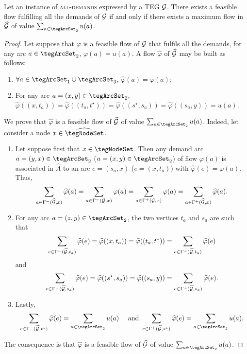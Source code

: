 \begin{bibunit}[ieeetr]
\begin{theorem}\label{theo:pol}
Let an instance of \textsc{all-demands} expressed by a TEG ${\cal G}$.
There exists a feasible flow fulfilling all the demands of ${\cal G}$ if and only if there exists a maximum flow in $\widehat{\cal G}$ of value $\sum_{a\in \tegArcSet_2} u(a)$. 
\end{theorem}
\begin{proof}
Let suppose that $\varphi$ is a feasible flow of ${\cal G}$ that fulfils all the demands, \ie for any arc $a\in \tegArcSet_2$, $\varphi(a)=u(a)$.
A flow $\widehat{\varphi}$ of $\widehat{\cal G}$ may be built as follows:
\begin{enumerate}
\item
$\forall a\in \tegArcSet_1 \cup \tegArcSet_3$, 
$\widehat{\varphi}(a)=\varphi(a)$;
\item
For any arc $a=(x,y)\in \tegArcSet_2$, 
$\widehat{\varphi}((x,t_a))=\widehat{\varphi}((t_a,t^\star))=\widehat{\varphi}((s^\star, s_a))=\widehat{\varphi}( (s_a,y))=u(a)$.
\end{enumerate}
We prove that $\widehat \varphi$ is a feasible flow of $\widehat{\cal G}$ of value $\sum_{a \in \tegArcSet_2} u(a)$. 
Indeed, let consider a node $x \in \widehat{\tegNodeSet}$.
\begin{enumerate}
\item Let suppose first that $x \in \tegNodeSet$. Then any demand arc ${a = (y,x) \in \tegArcSet_2}$ (\resp ${a = (x,y) \in \tegArcSet_2}$) of flow $\varphi(a)$ is associated in $\widehat{A}$ to an
arc $e = (s_a, x)$ (\resp $e = (x, t_a)$) with ${\widehat{\varphi}(e) = \varphi(a)}$.
Thus, 
\[\sum_{a \in \Gamma^-({\widehat{\cal G}},x)} \widehat{\varphi}(a)=
\sum_{a \in \Gamma^-({\cal G},x)} \varphi(a)=\sum_{a \in \Gamma^+({\cal G},x)} \varphi(a)=
\sum_{a \in \Gamma^+({\widehat{\cal G}},x)} \widehat{\varphi}(a)\text{.}\]
\item
For any arc $a=(z,y)\in \tegArcSet_2$, the two vertices $t_a$ and $s_a$ are such that
\[\sum_{e \in \Gamma^-({\widehat{\cal G}},t_a)} \widehat{\varphi}(e)=\widehat{\varphi}((x,t_a))=\widehat{\varphi}((t_a, t^\star))=\sum_{e \in \Gamma^+({\widehat{\cal G}}, t_a)} \widehat{\varphi}(e)\]
and
\[\sum_{e \in \Gamma^-({\widehat{\cal G}},s_a)} \widehat{\varphi}(e)=\widehat{\varphi}((s^\star,s_a))=\widehat{\varphi}((s_a, y))=\sum_{e \in \Gamma^+({\widehat{\cal G}},s_a)} \widehat{\varphi}(e)\text{.}\]
\item
Lastly, \[\sum_{e \in \Gamma^-({\widehat{\cal G}},t^\star)} \widehat{\varphi}(e)=\sum_{a\in \tegArcSet_2} u(a) \text{ ~~ and } \sum_{e \in \Gamma^+({\widehat{\cal G}},s^\star)} \widehat{\varphi}(e)=\sum_{a\in \tegArcSet_2} u(a)\text{.}\]
\end{enumerate}
The consequence is that $\widehat\varphi$ is a feasible flow of $\widehat{\cal G}$ of value $\sum_{a\in \tegArcSet_2} u(a)$. 


\end{proof}
\end{bibunit}
